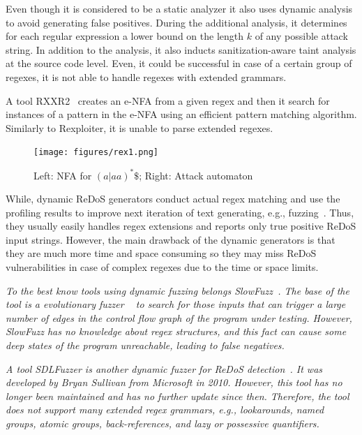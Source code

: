 \documentclass[acmsmall,screen]{acmart}
\begin{document}
%
Even though it is considered to be a static analyzer it also uses dynamic analysis
% 
to avoid generating false positives.
%
During the additional analysis, it determines for each regular expression 
a lower bound on the length $k$ of any possible attack string.
%
In addition to the analysis, it also inducts sanitization-aware taint analysis at the source code level.
%
Even, it could be successful in case of a certain group of regexes,
it is not able to handle regexes with extended grammars.




A tool RXXR2~\cite{rxxr2thesis, rxxr2} creates an e-NFA from a given regex and 
then it search for instances of a pattern
in the e-NFA using an efficient pattern matching algorithm.
%
Similarly to Rexploiter, it is unable to parse extended regexes.

\begin{figure}
  \vspace{-3mm}
  \hspace{-10mm}
  \begin{center}
    \texttt{[image: figures/rex1.png]}
  \end{center}
\caption{Left: NFA for $(a|aa)^*\$$; Right: Attack automaton}
  \label{fig:rex}
\end{figure}



%
While, dynamic ReDoS generators conduct actual regex matching and
use the profiling results to improve next iteration of text generating, 
e.g., fuzzing~\cite{fuzzing}. 
%
Thus, they usually easily handles regex extensions
and reports only true positive ReDoS input strings. 
%
However, the main drawback of the dynamic generators is that
they are much more time and space consuming so they may
miss ReDoS vulnerabilities in case of complex regexes due
to the time or space limits.
%


\emph{
To the best know tools using dynamic fuzzing belongs
SlowFuzz~\cite{slowfuzz}.
%
The base of the tool is a evolutionary fuzzer ~\cite{libfuzz}
 to search for those inputs that can trigger a
large number of edges in the control flow graph of the program
under testing. 
%
However,  SlowFuzz has
no knowledge about regex structures, and this fact can cause some
deep states of the program unreachable, leading to false negatives.}

\emph{
A tool SDLFuzzer is another dynamic fuzzer for ReDoS detection~\cite{}.
%
It was developed by Bryan Sullivan from Microsoft in 2010. 
%
However, this tool has no longer been maintained and has no further update
since then. 
%
Therefore, the tool does not support many extended
regex grammars, e.g., lookarounds, named groups, atomic groups,
back-references, and lazy or possessive quantifiers.
}
\end{document}

